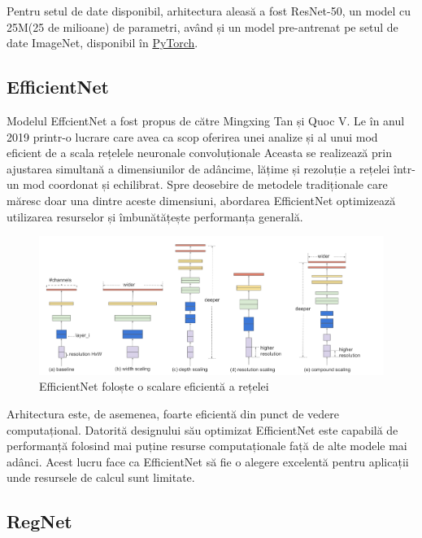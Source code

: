 Pentru setul de date disponibil, arhitectura aleasă a fost ResNet-50, un model cu 25M(25 de milioane) de parametri, având și un model pre-antrenat pe setul de date ImageNet, disponibil în \href{https://pytorch.org/vision/master/models/generated/torchvision.models.resnet50.html#torchvision.models.resnet50}{PyTorch}. 

\subsection{EfficientNet}

Modelul EffcientNet a fost propus de către Mingxing Tan și Quoc V. Le în anul 2019 \cite{tan2019efficientnet} printr-o lucrare care avea ca scop oferirea unei analize și al unui mod eficient de a scala rețelele neuronale convoluționale  Aceasta se realizează prin ajustarea simultană a dimensiunilor de adâncime, lățime și rezoluție a rețelei într-un mod coordonat și echilibrat. Spre deosebire de metodele tradiționale care măresc doar una dintre aceste dimensiuni, abordarea EfficientNet optimizează utilizarea resurselor și îmbunătățește performanța generală.

\begin{figure}[ht]
         \centering 
         \includegraphics[width=0.7\linewidth]{images/effnet_arch.png}
         \captionsetup{font=footnotesize}
     \caption{EfficientNet foloște o scalare eficientă a rețelei\cite{tan2019efficientnet}} 
\end{figure}

\newpage

Arhitectura este, de asemenea, foarte eficientă din punct de vedere computațional. Datorită designului său optimizat EfficientNet este capabilă de performanță folosind mai puține resurse computaționale față de alte modele mai adânci. Acest lucru face ca EfficientNet să fie o alegere excelentă pentru aplicații unde resursele de calcul sunt limitate. 

\subsection{RegNet}

